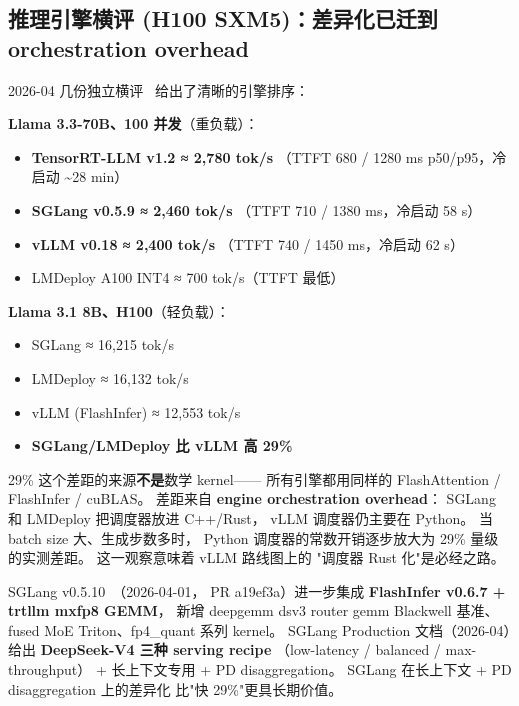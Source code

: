 \subsection{推理引擎横评 (H100 SXM5)：差异化已迁到 orchestration overhead}
\label{sec:engine-bench-2026}

2026-04 几份独立横评~\cite{enginebench2026}
给出了清晰的引擎排序：

\textbf{Llama 3.3-70B、100 并发}（重负载）：
\begin{itemize}[noitemsep]
  \item \textbf{TensorRT-LLM v1.2 ≈ 2,780 tok/s}
        （TTFT 680 / 1280 ms p50/p95，冷启动 \textasciitilde{}28 min）
  \item \textbf{SGLang v0.5.9 ≈ 2,460 tok/s}
        （TTFT 710 / 1380 ms，冷启动 58 s）
  \item \textbf{vLLM v0.18 ≈ 2,400 tok/s}
        （TTFT 740 / 1450 ms，冷启动 62 s）
  \item LMDeploy A100 INT4 ≈ 700 tok/s（TTFT 最低）
\end{itemize}

\textbf{Llama 3.1 8B、H100}（轻负载）：
\begin{itemize}[noitemsep]
  \item SGLang ≈ 16,215 tok/s
  \item LMDeploy ≈ 16,132 tok/s
  \item vLLM (FlashInfer) ≈ 12,553 tok/s
  \item \textbf{SGLang/LMDeploy 比 vLLM 高 29\%}
\end{itemize}

29\% 这个差距的来源\textbf{不是}数学 kernel——
所有引擎都用同样的 FlashAttention / FlashInfer / cuBLAS。
差距来自 \textbf{engine orchestration overhead}：
SGLang 和 LMDeploy 把调度器放进 C++/Rust，
vLLM 调度器仍主要在 Python。
当 batch size 大、生成步数多时，
Python 调度器的常数开销逐步放大为 29\% 量级的实测差距。
这一观察意味着 vLLM 路线图上的
"调度器 Rust 化"是必经之路。

SGLang v0.5.10~\cite{sglang0510}（2026-04-01，
PR a19ef3a）进一步集成
\textbf{FlashInfer v0.6.7 + trtllm mxfp8 GEMM}，
新增 deepgemm dsv3 router gemm Blackwell 基准、
fused MoE Triton、fp4\_quant 系列 kernel。
SGLang Production 文档（2026-04）给出
\textbf{DeepSeek-V4 三种 serving recipe}
（low-latency / balanced / max-throughput）
+ 长上下文专用 + PD disaggregation。
SGLang 在长上下文 + PD disaggregation 上的差异化
比"快 29\%"更具长期价值。


